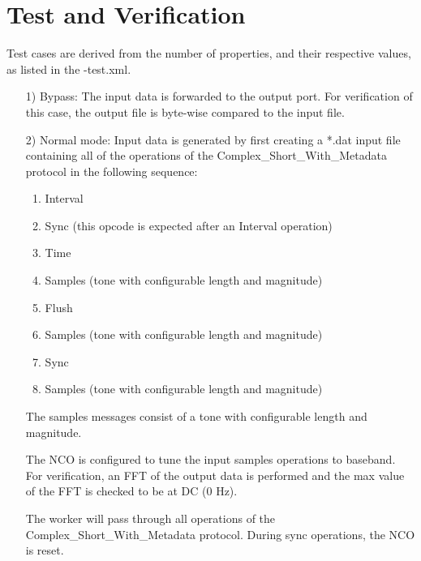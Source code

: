 \section*{Test and Verification}
Test cases are derived from the number of properties, and their respective values, as listed in the \comp-test.xml.
\begin{itemize}
	\item[1)] Bypass: The input data is forwarded to the output port. For verification of this case, the output file is byte-wise compared to the input file.
	\item[2)] Normal mode:
	Input data is generated by first creating a *.dat input file containing all of the operations of the Complex\_Short\_With\_Metadata protocol in the following sequence:
\begin{enumerate}
	\item Interval
	\item Sync (this opcode is expected after an Interval operation)
	\item Time
	\item Samples (tone with configurable length and magnitude)
	\item Flush
	\item Samples (tone with configurable length and magnitude)
	\item Sync
	\item Samples (tone with configurable length and magnitude)
\end{enumerate}
The samples messages consist of a tone with configurable length and magnitude.\medskip

The NCO is configured to tune the input samples operations to baseband. For verification, an FFT of the output data is performed and the max value of the FFT is checked to be at DC (0 Hz).\medskip

The worker will pass through all operations of the Complex\_Short\_With\_Metadata protocol. During sync operations, the NCO is reset.

\end{itemize}



